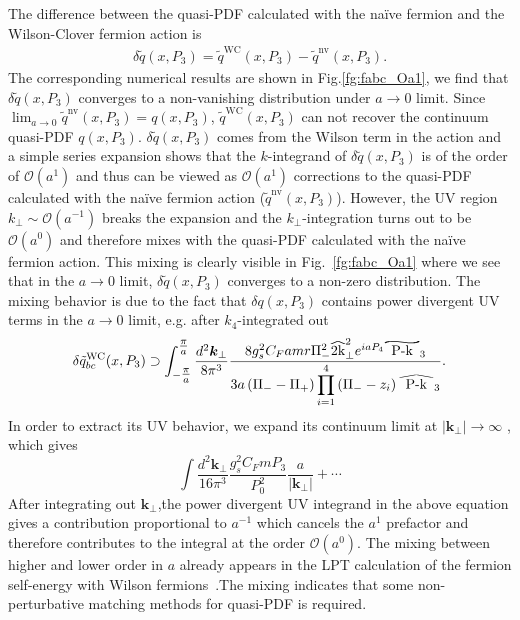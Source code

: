 \documentclass[english,preprint,aps,prd,showpacs,superscriptaddress,nofootinbib,tightenlines]{revtex4}
\renewcommand\widehat[1]{%
\savestack{\tmpbox}{\stretchto{%
  \scaleto{%
    \scalerel*[\widthof{\ensuremath{#1}}]{\kern-.6pt\bigwedge\kern-.6pt}%
    {\rule[-\textheight/2]{1ex}{\textheight}}%
  }{\textheight}%
}{0.5ex}}%
\stackon[1pt]{#1}{\tmpbox}%
}
\renewcommand\widetilde[1]{%
\savestack{\tmpbox}{\stretchto{%
  \scaleto{%
    \scalerel*[\widthof{\ensuremath{#1}}]{\kern-.6pt\boldsymbol{\sim}\kern-.6pt}%
    {\rule[-\textheight/2]{1ex}{\textheight}}%
  }{\textheight}%
}{0.5ex}}%
\stackon[1pt]{#1}{\tmpbox}%
}
\begin{document}
{The difference between the quasi-PDF calculated with the na\"ive fermion and the
Wilson-Clover fermion action is
\begin{align}
\delta \tilde{q}\left(x,P_3\right)=\tilde{q}^{\mathrm{WC}}\left(x,P_3\right)-\tilde{q}^{\mathrm{nv}}\left(x,P_3\right).
\end{align} 
The corresponding numerical results are shown
in Fig.\ref{fg:fabc_Oa1}, we find that $\delta\tilde{q}\left(x,P_3\right)$ converges to a non-vanishing distribution under $a\rightarrow 0$ limit. Since $\lim_{a\rightarrow0} \tilde q^{\mathrm{nv}}(x,P_3) = q(x,P_3)$,  $\tilde q^{\mathrm{WC}}(x,P_3)$ can not recover the continuum quasi-PDF $q\left(x,P_3\right)$. $\delta\tilde{q}(x,P_3)$ comes from the Wilson term 
in the action and a simple series expansion shows that the $k$-integrand of 
$\delta\tilde{q}\left(x,P_3\right)$ is of the order of $\mathcal{O}\left(a^1\right)$ and 
thus can be viewed as $\mathcal{O}\left(a^1\right)$ corrections to the quasi-PDF calculated 
with the na\"ive fermion action ($\tilde q^{\mathrm{nv}}\left(x,P_3\right)$). However, the 
UV region $k_\perp\sim \mathcal{O}\left(a^{-1}\right)$ breaks the expansion and the 
$k_\perp$-integration turns out to be $\mathcal{O}\left(a^0\right)$ and therefore mixes 
with the quasi-PDF calculated with the na\"ive fermion action. This mixing is clearly 
visible in Fig.~\ref{fg:fabc_Oa1} where we see that in the
$a\rightarrow0$ limit, $\delta\tilde{q}\left(x,P_3\right)$ converges
to a non-zero distribution. The mixing behavior is due to the fact that $\delta q(x,P_3)$
contains power divergent UV terms in the $a\rightarrow0$ limit, e.g. after 
$k_4$-integrated out
\begin{align}
\delta\tilde{q}^{\mathrm{WC}}_{bc}(x,P_3)\supset\int_{-\tfrac{\pi}{a}}^{\tfrac{\pi}{a}} \frac{d^2\boldsymbol{k}_\perp}{8\pi^3}\frac{8g_s^2 C_F amr\Pi_-^2\widehat{2k}^2_\perp e^{iaP_4}\widetilde{P-k}_3}{3a\left(\Pi_- - \Pi_+\right)
\displaystyle{\prod_{i=1}^4}\left(\Pi_--z_i\right)\widehat{P-k}_3}.
\end{align}
In order
to extract its UV behavior, we expand its continuum limit at
$\left|\boldsymbol{k}_{\perp}\right|\rightarrow\infty$ , which gives
\begin{equation}
\int \frac{d^2\boldsymbol{k}_\perp}{16\pi^3}\frac{g_s^2C_F mP_3}{P_0^2}\frac{a}{\left|\boldsymbol{k}_\perp\right|}+\cdots
\end{equation}
After integrating out $\boldsymbol{k}_\perp$,the power divergent UV integrand in the 
above equation gives a contribution proportional to $a^{-1}$ which cancels the 
$a^{1}$ prefactor and therefore contributes to the integral at the order $\mathcal{O}\left(a^{0}\right)$.} 
The mixing between higher and lower order in $a$ already appears in the LPT calculation of 
the fermion self-energy with Wilson fermions~\cite{Capitani:2002mp}.The mixing indicates that some non-perturbative matching methods for quasi-PDF is required.
\end{document}
